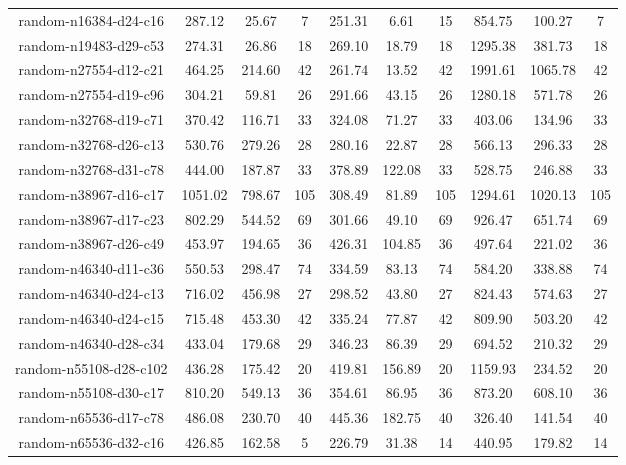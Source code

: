 \documentclass[letterpaper,12pt]{article}
\theoremstyle{remark}
\begin{document}
\begin{table}[ht]
\begin{tabular}{|c|c|c|c|c|c|c|c|c|c|}
random-n16384-d24-c16&  287.12  & 25.67 &  7  &  251.31  &  6.61  & 15  &  854.75  & 100.27  &  7  \\
random-n19483-d29-c53&  274.31  & 26.86 & 18  &  269.10  & 18.79  & 18  & 1295.38  & 381.73  & 18  \\
random-n27554-d12-c21&  464.25  & 214.60& 42  &  261.74  & 13.52  & 42  & 1991.61  & 1065.78 & 42  \\
random-n27554-d19-c96&  304.21  & 59.81 & 26  &  291.66  & 43.15  & 26  & 1280.18  & 571.78  & 26  \\
random-n32768-d19-c71&  370.42  & 116.71& 33  &  324.08  & 71.27  & 33  &  403.06  & 134.96  & 33  \\
random-n32768-d26-c13&  530.76  & 279.26& 28  &  280.16  & 22.87  & 28  &  566.13  & 296.33  & 28  \\
random-n32768-d31-c78&  444.00  & 187.87& 33  &  378.89  & 122.08 & 33  &  528.75  & 246.88  & 33  \\
random-n38967-d16-c17& 1051.02  & 798.67& 105 &  308.49  & 81.89  & 105 & 1294.61  & 1020.13 & 105 \\
random-n38967-d17-c23&  802.29  & 544.52& 69  &  301.66  & 49.10  & 69  &  926.47  & 651.74  & 69  \\
random-n38967-d26-c49&  453.97  & 194.65& 36  &  426.31  & 104.85 & 36  &  497.64  & 221.02  & 36  \\
random-n46340-d11-c36&  550.53  & 298.47& 74  &  334.59  & 83.13  & 74  &  584.20  & 338.88  & 74  \\
random-n46340-d24-c13&  716.02  & 456.98& 27  &  298.52  & 43.80  & 27  &  824.43  & 574.63  & 27  \\
random-n46340-d24-c15&  715.48  & 453.30& 42  &  335.24  & 77.87  & 42  &  809.90  & 503.20  & 42  \\
random-n46340-d28-c34&  433.04  & 179.68& 29  &  346.23  & 86.39  & 29  &  694.52  & 210.32  & 29  \\
random-n55108-d28-c102& 436.28  & 175.42& 20  &  419.81  & 156.89 & 20  & 1159.93  & 234.52  & 20  \\
random-n55108-d30-c17 & 810.20  & 549.13& 36  &  354.61  & 86.95  & 36  &  873.20  & 608.10  & 36  \\
random-n65536-d17-c78 & 486.08  & 230.70& 40  &  445.36  & 182.75 & 40  &  326.40  & 141.54  & 40  \\
random-n65536-d32-c16 & 426.85  & 162.58&  5  &  226.79  & 31.38  & 14  &  440.95  & 179.82  & 14  \\
\hline
\end{tabular}
\end{table}
\end{document}
